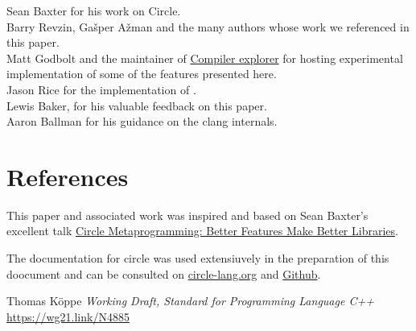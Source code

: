 \documentclass{wg21}
\begin{document}
Sean Baxter for his work on Circle.\\

Barry Revzin, Gašper Ažman and the many authors whose work we referenced in this paper.\\

Matt Godbolt and the maintainer of \href{compiler-explorer.com}{Compiler explorer} for hosting experimental implementation of some of the features presented here.\\

Jason Rice for the implementation of .\\

Lewis Baker, for his valuable feedback on this paper.\\

Aaron Ballman for his guidance on the clang internals.

\section{References}

This paper and associated work was inspired and based on Sean Baxter's excellent talk
\href{https://www.youtube.com/watch?v=15j4bkipuAg}{Circle Metaprogramming: Better Features Make Better Libraries}.

The documentation for circle was used extensiuvely in the preparation of this doocument and can be consulted on \href{https://www.circle-lang.org/}{circle-lang.org}
and \href{https://github.com/seanbaxter/circle}{Github}.

\vspace{20mm}

\renewcommand{\section}[2]{}%



\begin{thebibliography}{9}

Thomas Köppe
\emph{Working Draft, Standard for Programming Language C++}\newline
\url{https://wg21.link/N4885}


\end{thebibliography}
\end{document}
